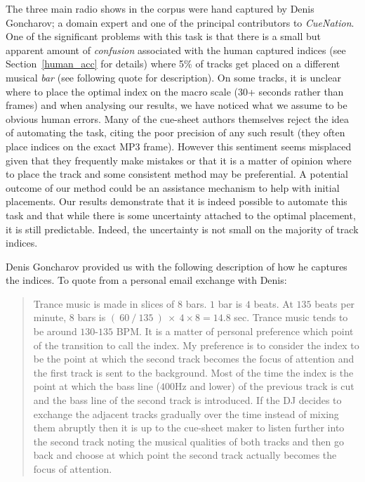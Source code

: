 \documentclass[twocolumn]{article}
\begin{document}
	The three main radio shows in the corpus were hand captured by Denis Goncharov; a domain expert and one of the principal contributors to \textit{CueNation}. One of the significant problems with this task is that there is a small but apparent amount of \textit{confusion} associated with the human captured indices (see Section~\ref{human_acc} for details) where 5\% of tracks get placed on a different musical \textit{bar} (see following quote for description). On some tracks, it is unclear where to place the optimal index on the macro scale (30+ seconds rather than frames) and when analysing our results, we have noticed what we assume to be obvious human errors. Many of the cue-sheet authors themselves reject the idea of automating the task, citing the poor precision of any such result (they often place indices on the exact MP3 frame). However this sentiment seems misplaced given that they frequently make mistakes or that it is a matter of opinion where to place the track and some consistent method may be preferential. A potential outcome of our method could be an assistance mechanism to help with initial placements. Our results demonstrate that it is indeed possible to automate this task and that while there is some uncertainty attached to the optimal placement, it is still predictable. Indeed, the uncertainty is not small on the majority of track indices. 
	
	Denis Goncharov provided us with the following description of how he captures the indices. To quote from a personal email exchange with Denis:
	
	\begin{quote}
		Trance music is made in slices of $8$ bars. $1$ bar is $4$ beats. At $135$ beats per minute, $8$ bars is $(~60~/~135~)~\times~4 \times 8 = 14.8$ sec. Trance music tends to be around $130$-$135$ BPM. It is a matter of personal preference which point of the transition to call the index. My preference is to consider the index to be the point at which the second track becomes the focus of attention and the first track is sent to the background. Most of the time the index is the point at which the bass line ($400$Hz and lower) of the previous track is cut and the bass line of the second track is introduced. If the DJ decides to exchange the adjacent tracks gradually over the time instead of mixing them abruptly then it is up to the cue-sheet maker to listen further into the second track noting the musical qualities of both tracks and then go back and choose at which point the second track actually becomes the focus of attention.
	\end{quote}
	
\end{document}

